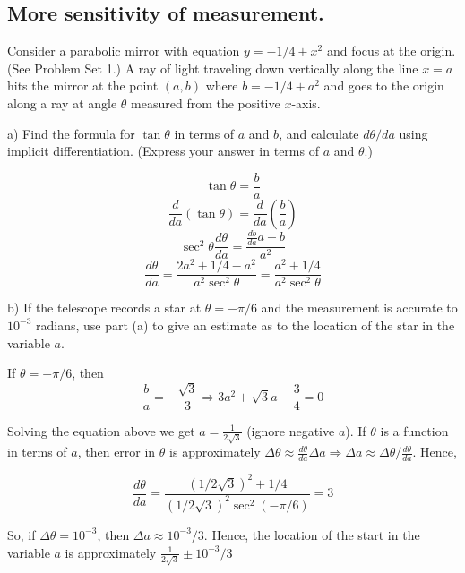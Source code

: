 \documentclass{article}
\begin{document}
\newpage
\subsection{More sensitivity of measurement.}
\begin{tcolorbox}
    Consider a parabolic mirror with equation $y = -1/4 + x^2$ and focus at the origin. (See Problem Set 1.) A ray of light traveling down vertically along the line $x = a$ hits the mirror at the point $(a, b)$ where $b = -1/4+a^2$ and goes to the origin along a ray at angle $\theta$ measured from the positive $x$-axis.
    \par a) Find the formula for $\tan{\theta}$ in terms of $a$ and $b$, and calculate $d\theta/da$ using implicit differentiation. (Express your answer in terms of $a$ and $\theta$.)
\end{tcolorbox}
\begin{figure}[htp!]
    \centering
    
    \label{fig:fig11}
\end{figure}

\[ \tan{\theta} = \frac{b}{a} \]
\[ \frac{d}{da} \left( \tan{\theta} \right) = \frac{d}{da} \left( \frac{b}{a} \right) \]
\[ \sec^2{\theta} \frac{d\theta}{da} = \frac{\frac{db}{da}a - b}{a^2} \]
\[ \frac{d\theta}{da} = \frac{2a^2 + 1/4 - a^2}{a^2\sec^2{\theta}} = \frac{a^2+1/4}{a^2\sec^2{\theta}} \]

\newpage
\begin{tcolorbox}
    b) If the telescope records a star at $\theta = -\pi/6$ and the measurement is accurate to $10^{-3}$ radians, use part (a) to give an estimate as to the location of the star in the variable $a$.
\end{tcolorbox}
If $\theta = -\pi/6$, then
\[ \frac{b}{a} = -\frac{\sqrt{3}}{3} \Rightarrow 3a^2 + \sqrt{3}a - \frac{3}{4} = 0 \]
\par Solving the equation above we get $a = \frac{1}{2\sqrt{3}}$ (ignore negative $a$). If $\theta$ is a function in terms of $a$, then error in $\theta$ is approximately $\Delta \theta \approx \frac{d\theta}{da}\Delta a \Rightarrow \Delta a \approx \Delta \theta / \frac{d\theta}{da}$. Hence,

\[ \frac{d\theta}{da} = \frac{(1/2\sqrt{3})^2 + 1/4}{(1/2\sqrt{3})^2\sec^2{(-\pi/6)}} = 3 \]

So, if $\Delta \theta = 10^{-3}$, then $\Delta a \approx 10^{-3}/3$. Hence, the location of the start in the variable $a$ is approximately $\frac{1}{2\sqrt{3}} \pm 10^{-3}/3$ 
\end{document}
